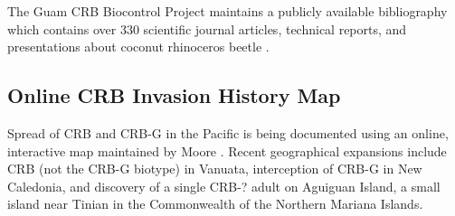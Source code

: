 \documentclass[12pt,letterpaper,english,bibliography=totocnumbered]{scrartcl}
\begin{document}
The Guam CRB Biocontrol Project maintains a publicly available bibliography which contains over 330 scientific journal articles, technical reports, and presentations about coconut rhinoceros beetle \cite{moore_coconut_2019}.

\subsection{Online CRB Invasion History Map}

Spread of CRB and CRB-G in the Pacific is being documented using an online, interactive map maintained by Moore \cite{moore_web_2019}. Recent geographical expansions include CRB (not the CRB-G biotype) in Vanuata, interception of CRB-G in New Caledonia, and discovery of a single CRB-? adult on Aguiguan Island, a small island near Tinian in the Commonwealth of the Northern Mariana Islands.

\printbibliography
\end{document}
